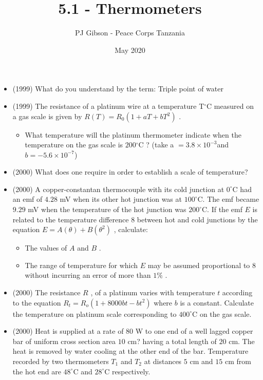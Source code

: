 \documentclass{article}
\title{\textbf{5.1 - Thermometers}}
\author{PJ Gibson - Peace Corps Tanzania}
\date{May 2020}
\begin{document}
\maketitle

\begin{itemize}
\item (1999)  What do you understand by the term:   Triple point of water
\item (1999)  The resistance of a platinum wire at a temperature T​$ ^{\circ}$C measured on a gas scale is given by $ R(T)=R​_{0​}(1+ a T+bT​^{2}​)$ .
 \begin{itemize}
\item What temperature will the platinum thermometer indicate when the temperature on the gas scale is $ 200​^{\circ}$C ? (take a $ =3.8 \times 10^{-3}$ ​ and $ b=-5.6 \times 10^{-7}$ ​)
\end{itemize}
\item (2000)  What does one require in order to establish a scale of temperature?
\item (2000)  A copper-constantan thermocouple with its cold junction at $ 0^{\circ}$C had an emf of $ 4.28$ mV when its other hot junction was at $ 100^{\circ}$C. The emf became $ 9.29$ mV when the temperature of the hot junction was $ 200^{\circ}$C. If the emf $ E$ is related to the temperature difference $ 8$ between hot and cold junctions by the equation $ E= A(\theta )+B(\theta ^{2})$ , calculate:
 \begin{itemize}
\item The values of $ A$ and $ B$ .
\item The range of temperature for which $ E$ may be assumed proportional to $ 8$ without incurring an error of more than $ 1\%$ .
\end{itemize}
\item (2000)  The resistance $ R$ , of a platinum varies with temperature $ t$ according to the equation $ R_{t}=R_{o}(1+8000bt -b t^{2})$ where $ b$ is a constant. Calculate the temperature on platinum scale corresponding to $ 400^{\circ}$C on the gas scale. 
\item (2000)  Heat is supplied at a rate of $ 80$ W to one end of a well lagged copper bar of uniform cross section area $ 10$ cm? having a total length of $ 20$ cm. The heat is removed by water cooling at the other end of the bar. Temperature recorded by two thermometers $ T_{1}$ and $ T_{2}$ at distances $ 5$ cm and $ 15$ cm from the hot end are $ 48^{\circ}$C and $ 28^{\circ}$C respectively.
 \begin{itemize}

\end{itemize}
\end{itemize}
\end{document}
